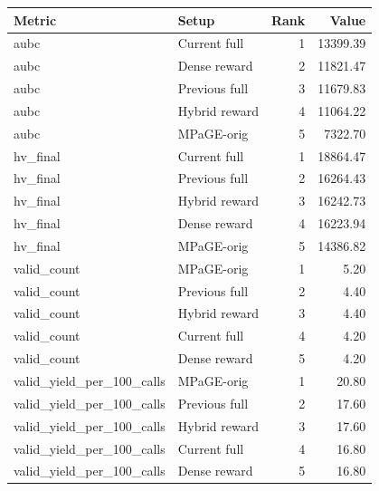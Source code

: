\begin{tabular}{llrr}
\toprule
Metric & Setup & Rank & Value \\
\midrule
aubc & Current full & 1 & 13399.39 \\
aubc & Dense reward & 2 & 11821.47 \\
aubc & Previous full & 3 & 11679.83 \\
aubc & Hybrid reward & 4 & 11064.22 \\
aubc & MPaGE-orig & 5 & 7322.70 \\
hv_final & Current full & 1 & 18864.47 \\
hv_final & Previous full & 2 & 16264.43 \\
hv_final & Hybrid reward & 3 & 16242.73 \\
hv_final & Dense reward & 4 & 16223.94 \\
hv_final & MPaGE-orig & 5 & 14386.82 \\
valid_count & MPaGE-orig & 1 & 5.20 \\
valid_count & Previous full & 2 & 4.40 \\
valid_count & Hybrid reward & 3 & 4.40 \\
valid_count & Current full & 4 & 4.20 \\
valid_count & Dense reward & 5 & 4.20 \\
valid_yield_per_100_calls & MPaGE-orig & 1 & 20.80 \\
valid_yield_per_100_calls & Previous full & 2 & 17.60 \\
valid_yield_per_100_calls & Hybrid reward & 3 & 17.60 \\
valid_yield_per_100_calls & Current full & 4 & 16.80 \\
valid_yield_per_100_calls & Dense reward & 5 & 16.80 \\
\bottomrule
\end{tabular}
